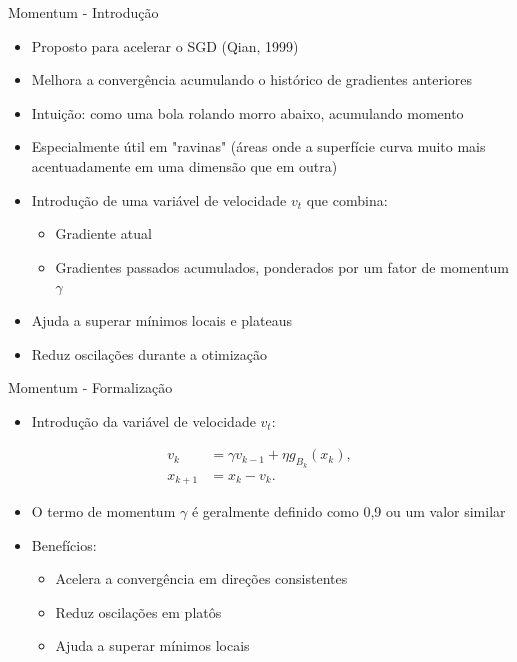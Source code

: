 \documentclass[aspectratio=1610]{beamer}
\begin{document}
\begin{frame}{Momentum - Introdução}
\begin{itemize}
    \item Proposto para acelerar o SGD (Qian, 1999)
    \item Melhora a convergência acumulando o histórico de gradientes anteriores
    \item Intuição: como uma bola rolando morro abaixo, acumulando momento
    \item Especialmente útil em "ravinas" (áreas onde a superfície curva muito mais acentuadamente em uma dimensão que em outra)
    \item Introdução de uma variável de velocidade $v_t$ que combina:
    \begin{itemize}
        \item Gradiente atual
        \item Gradientes passados acumulados, ponderados por um fator de momentum $\gamma$
    \end{itemize}
    \item Ajuda a superar mínimos locais e plateaus
    \item Reduz oscilações durante a otimização
\end{itemize}
\end{frame}

\begin{frame}{Momentum - Formalização}
\begin{itemize}
    \item Introdução da variável de velocidade $v_t$:
\end{itemize}

\begin{align}
v_k &= \gamma v_{k-1} + \eta g_{B_k}(x_k), \\
x_{k+1} &= x_k - v_k.
\end{align}

\begin{itemize}
    \item O termo de momentum $\gamma$ é geralmente definido como 0,9 ou um valor similar
    \item Benefícios:
    \begin{itemize}
        \item Acelera a convergência em direções consistentes
        \item Reduz oscilações em platôs
        \item Ajuda a superar mínimos locais
    \end{itemize}
\end{itemize}
\end{frame}
\end{document}
